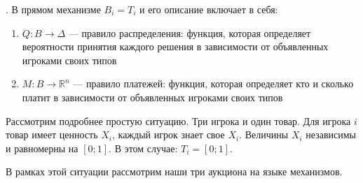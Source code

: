 \begin{mydef} . В прямом механизме $ B_{i}=T_{i} $ и его описание включает в себя:
\begin{enumerate}
\item $ Q:B\to \Delta $ --- правило распределения: функция, которая определяет вероятности принятия каждого решения в зависимости от объявленных игроками своих типов
\item $ M:B\to \mathbb{R}^{n}  $ --- правило платежей: функция, которая определяет кто и сколько платит в зависимости от объявленных игроками своих типов
\end{enumerate}
\end{mydef}


Рассмотрим подробнее простую ситуацию. Три игрока и один товар. Для игрока $ i $ товар имеет ценность $ X_{i} $, каждый игрок знает свое $ X_{i} $. Величины $ X_{i}  $ независимы и равномерны на $ [0;1] $. В этом случае: $ T_{i}=[0;1] $.

В рамках этой ситуации рассмотрим наши три аукциона на языке механизмов. 






